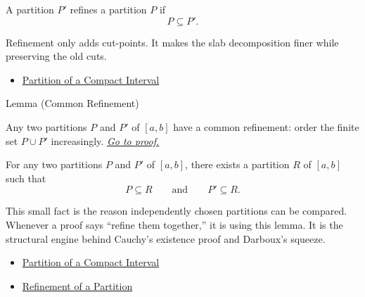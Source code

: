\begin{remark*}
A partition \(P'\) refines a partition \(P\) if
\[
  P\subseteq P'.
\]
\end{remark*}

\begin{remark*}[Interpretation]
Refinement only adds cut-points. It makes the slab decomposition finer while
preserving the old cuts.
\end{remark*}

\begin{dependencies}
\begin{itemize}
  \item \hyperref[def:integration-partition]{Partition of a Compact Interval}
\end{itemize}
\end{dependencies}

\begin{lemmabox}{Lemma (Common Refinement)}
\begin{lemma}
\label{lem:common-refinement-partitions}
Any two partitions \(P\) and \(P'\) of \([a,b]\) have a common refinement:
order the finite set \(P\cup P'\) increasingly.
\hyperref[prf:common-refinement-partitions]{\textit{Go to proof.}}
\end{lemma}
\end{lemmabox}

\begin{remark*}
For any two partitions \(P\) and \(P'\) of \([a,b]\), there exists a
partition \(R\) of \([a,b]\) such that
\[
  P\subseteq R
  \qquad\text{and}\qquad
  P'\subseteq R.
\]
\end{remark*}

\begin{remark*}[Interpretation]
This small fact is the reason independently chosen partitions can be compared.
Whenever a proof says ``refine them together,'' it is using this lemma. It is
the structural engine behind Cauchy's existence proof and Darboux's squeeze.
\end{remark*}

\begin{dependencies}
\begin{itemize}
  \item \hyperref[def:integration-partition]{Partition of a Compact Interval}
  \item \hyperref[def:partition-refinement]{Refinement of a Partition}
\end{itemize}
\end{dependencies}

